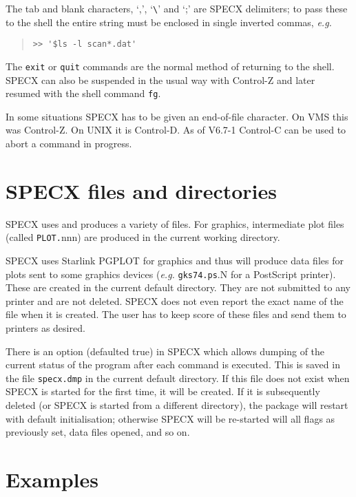\documentclass[twoside,11pt]{article}
\renewcommand{\_}{\texttt{\symbol{95}}}
\newenvironment{myquote}{\begin{quote}\begin{small}}{\end{small}\end{quote}}
\begin{document}
The tab and blank characters, `,', `\verb+\+' and `;' are SPECX delimiters;
to pass these to the shell the entire string must be enclosed in single
inverted commas, {\em e.g.}

\begin{myquote}
\begin{verbatim}
>> '$ls -l scan*.dat'
\end{verbatim}
\end{myquote}

The {\tt exit} or \texttt{quit} commands are the normal method of returning to
the shell.  SPECX can also be suspended in the usual way with Control-Z and
later resumed with the shell command {\tt fg}.

In some situations SPECX has to be given an end-of-file character. On
VMS this was Control-Z. On UNIX it is Control-D. As of V6.7-1 Control-C
can be used to abort a command in progress.


\section {SPECX files and directories}

SPECX uses and produces a variety of files. For graphics,
intermediate plot files (called {\tt PLOT.}nnn) are produced in the
current working directory.

SPECX uses Starlink PGPLOT for graphics and thus will produce data files for
plots sent to some graphics devices ({\em e.g.} {\tt gks74.ps}.N for a
PostScript printer). These are created in the current default directory. They
are not submitted to any printer and are not deleted. SPECX does not even
report the exact name of the file when it is created. The user has to keep
score of these files and send them to printers as desired.

There is an option (defaulted true) in SPECX which allows dumping of the
current status of the program after each command is executed. This is saved in
the file {\tt specx.dmp} in the current default directory. If this file does
not exist when SPECX is started for the first time, it will be created. If it
is subsequently deleted (or SPECX is started from a different directory), the
package will restart with default initialisation; otherwise SPECX will be
re-started will all flags as previously set, data files opened, and so on.


\section {Examples}
\end{document}
